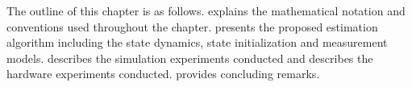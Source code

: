 
The outline of this chapter is as follows.
 explains the mathematical notation and conventions used
throughout the chapter.
 presents the proposed estimation algorithm including the
state dynamics, state initialization and measurement models.
 describes the simulation experiments conducted and
 describes the hardware experiments conducted.
 provides concluding remarks.
